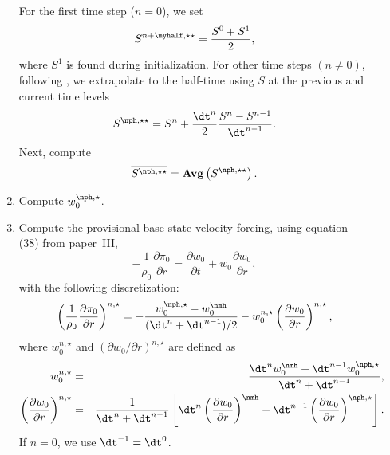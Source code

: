 \begin{description}
\begin{enumerate}
  For the first time step ($n=0$), we set
\begin{equation}
S^{n+\myhalf,\star\star} = \frac{S^0 + S^1}{2},
\end{equation}
  where $S^1$ is found during initialization.  For other time steps
  $(n \ne 0)$, following \cite{SNe}, we extrapolate
  to the half-time using $S$ at the previous and current
  time levels
\begin{equation}
S^{\nph,\star\star} = S^n + \frac{\dt^n}{2} \frac{S^n - S^{n-1}}{\dt^{n-1}}.
\end{equation}
  Next, compute
\begin{equation}
\overline{S^{\nph,\star\star}} = {\mathrm{\bf Avg}} \left(S^{\nph,\star\star}\right).
\end{equation}

\item Compute $w_0^{\nph,\star}$.

\item Compute the provisional base state velocity forcing, using equation (38)
  from paper~III,
\begin{equation}
-\frac{1}{\rho_0} \frac{\partial \pi_0}{\partial r} = \frac{\partial w_0}{\partial t} + w_0 \frac{\partial w_0}{\partial r}, \label{eq:pizero}
\end{equation}
  with the following discretization:
\begin{equation}
\left ( \frac{1}{\rho_0} \frac{\partial \pi_0}{\partial r} \right )^{n,\star} = -\frac{w_0^{\nph,\star} - w_0^\nmh}{(\dt^n+\dt^{n-1})/2} - w_0^{n,\star} \left(\frac{\partial w_0}{\partial r}\right)^{n,\star},
\end{equation} 
  where $w_0^{n,\star}$ and $(\partial w_0 / \partial r)^{n,\star}$ are defined as
\begin{eqnarray}
w_0^{n,\star} &=& \frac{\dt^{n} w_0^{\nmh} + \dt^{n-1} w_0^{\nph,\star}}{\dt^n+\dt^{n-1}}, \\
\left(\frac{\partial w_0}{\partial r}\right)^{n,\star} &=& \frac{1}{\dt^n+\dt^{n-1}}\left [ \dt^{n} \left(\frac{\partial w_0 }{ \partial r}\right)^{\nmh} + \dt^{n-1} \left(\frac{\partial w_0 }{ \partial r}\right)^{\nph,\star} \right ].\nonumber \\
\end{eqnarray}
  If $n=0$, we use $\dt^{-1} = \dt^0$.
\end{enumerate}


\end{description}
